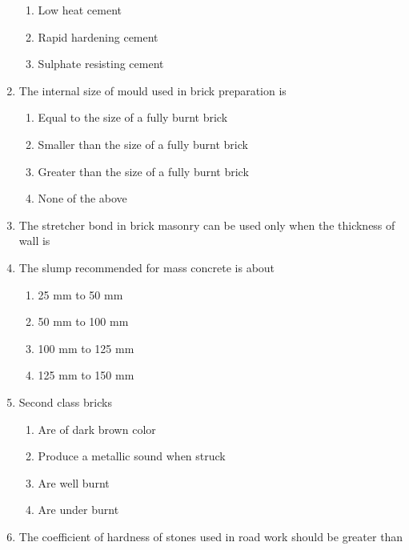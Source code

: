 \documentclass[11pt,a4paper]{article}
\begin{document}
\begin{enumerate}
\begin{enumerate}[label=\Alph*.]
\item{Low heat cement}
\item{Rapid hardening cement}
\item{Sulphate resisting cement}
\end{enumerate}
\item{The internal size of mould used in brick preparation is}
\begin{enumerate}[label=\Alph*.]
\item{Equal to the size of a fully burnt brick}
\item{Smaller than the size of a fully burnt brick}
\item{Greater than the size of a fully burnt brick}
\item{None of the above}
\end{enumerate}
\item{The stretcher bond in brick masonry can be used only when the thickness of wall is}
\\\begin{enumerate*}[itemjoin=\qquad, label=\Alph*.]
\item{90 mm}
\item{180 mm}
\item{190 mm}
\item{280 mm}
\end{enumerate*}
\item{The slump recommended for mass concrete is about}
\begin{enumerate}[label=\Alph*.]
\item{25 mm to 50 mm}
\item{50 mm to 100 mm}
\item{100 mm to 125 mm}
\item{125 mm to 150 mm}
\end{enumerate}
\item{Second class bricks}
\begin{enumerate}[label=\Alph*.]
\item{Are of dark brown color}
\item{Produce a metallic sound when struck}
\item{Are well burnt}
\item{Are under burnt}
\end{enumerate}
\item{The coefficient of hardness of stones used in road work should be greater than}
\\
\end{enumerate}
\end{document}
